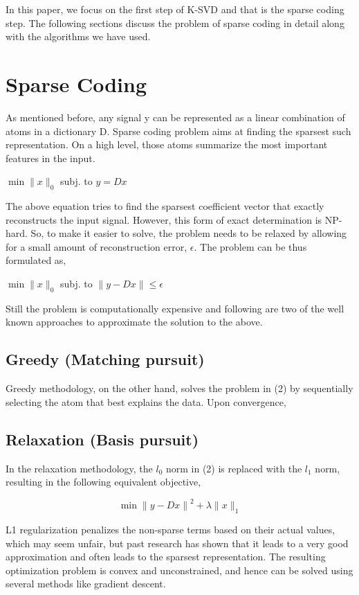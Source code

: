 \documentclass{article} %
\begin{document}
In this paper, we focus on the first step of K-SVD and that is the sparse coding step. The following sections discuss the problem of sparse coding in detail along with the algorithms we have used.
\section{Sparse Coding}
As mentioned before, any signal y can be represented as a linear combination of atoms in a dictionary D. Sparse coding problem aims at finding the sparsest such representation. On a high level, those atoms summarize the most important features in the input.\\
\begin{center}
$\min\|x\|_0$  subj. to $y=Dx$
\end{center}
The above equation tries to find the sparsest coefficient vector that exactly reconstructs the input signal. However, this form of exact determination is NP-hard. So, to make it easier to solve, the problem needs to be relaxed by allowing for a small amount of reconstruction error, $\epsilon$. The problem can be thus formulated as,\\
\begin{center}
$\min\|x\|_0$  subj. to $\|y-Dx\| \leq \epsilon$
\end{center}
Still the problem is computationally expensive and following are two of the well known approaches to approximate the solution to the above.



\subsection{Greedy (Matching pursuit)}
Greedy methodology, on the other hand, solves the problem in (2) by sequentially selecting the atom that best explains the data. Upon convergence, 


\subsection{Relaxation (Basis pursuit)}

In the relaxation methodology, the $l_0$ norm in (2) is replaced with the $l_1$ norm, resulting in the following equivalent objective,

\[\min{\|y-Dx\|}^2 +\lambda \|x\|_1\]

L1 regularization penalizes the non-sparse terms based on their actual values, which may seem unfair, but past research has shown that it leads to a very good approximation and often leads to the sparsest representation.  The resulting optimization problem is convex and unconstrained, and hence can be solved using several methods like gradient descent.
\end{document}
